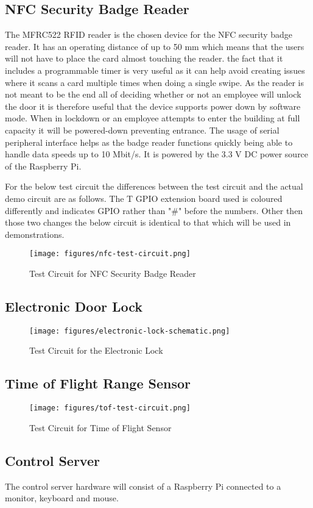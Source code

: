 \subsection{NFC Security Badge Reader}

The MFRC522 RFID reader is the chosen device for the NFC security badge reader. 
It has an operating distance of up to 50 mm which means that the users will not have to place
the card almost touching the reader. the fact that it includes a programmable timer
is very useful as it can help avoid creating issues where it scans a card multiple times 
when doing a single swipe. As the reader is not meant to be the end all of deciding 
whether or not an employee will unlock the door it is therefore useful that the device
supports power down by software mode. When in lockdown or an employee attempts
to enter the building at full capacity it will be powered-down preventing entrance.  
The usage of serial peripheral interface helps as the badge reader functions quickly 
being able to handle data speeds up to 10 Mbit/s. 
It is powered by the 3.3 V DC power source of the Raspberry Pi.


For the below test circuit the differences between the test circuit and the actual demo circuit
are as follows. The T GPIO extension board used is coloured differently
and indicates GPIO rather than "#" before the numbers. 
Other then those two changes the below circuit is identical to that which will be used in demonstrations.

\begin{figure}[!htb]
\centering
\texttt{[image: figures/nfc-test-circuit.png]}
\caption{Test Circuit for NFC Security Badge Reader}
\label{fig:nfc-test-circuit}
\end{figure}

\subsection{Electronic Door Lock}

\begin{figure}[!htb]
\centering
\texttt{[image: figures/electronic-lock-schematic.png]}
\caption{Test Circuit for the Electronic Lock}
\label{fig:electronic-lock-schematic}
\end{figure}

\subsection{Time of Flight Range Sensor}

\begin{figure}[!htb]
\centering
\texttt{[image: figures/tof-test-circuit.png]}
\caption{Test Circuit for Time of Flight Sensor}
\label{fig:tof-test-circuit}
\end{figure}


\subsection{Control Server}

The control server hardware will consist of a Raspberry Pi connected to a
monitor, keyboard and mouse.


